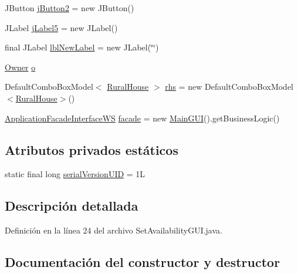 \begin{DoxyCompactItemize}
\item 
J\+Button \mbox{\hyperlink{classgui_1_1_set_availability_g_u_i_aae752324eac2634daf58978458c780cd}{j\+Button2}} = new J\+Button()
\item 
J\+Label \mbox{\hyperlink{classgui_1_1_set_availability_g_u_i_adaff504659254070536d646b331e2e5f}{j\+Label5}} = new J\+Label()
\item 
final J\+Label \mbox{\hyperlink{classgui_1_1_set_availability_g_u_i_a1f6f638242c97025fc857440f6669918}{lbl\+New\+Label}} = new J\+Label(\char`\"{}\char`\"{})
\item 
\mbox{\hyperlink{classdomain_1_1_owner}{Owner}} \mbox{\hyperlink{classgui_1_1_set_availability_g_u_i_a02f2fb2b0ea2556d734c4f066d396f44}{o}}
\item 
Default\+Combo\+Box\+Model$<$ \mbox{\hyperlink{classdomain_1_1_rural_house}{Rural\+House}} $>$ \mbox{\hyperlink{classgui_1_1_set_availability_g_u_i_a8ca9854f982f38653c058c2d5fae0110}{rhs}} = new Default\+Combo\+Box\+Model$<$\mbox{\hyperlink{classdomain_1_1_rural_house}{Rural\+House}}$>$()
\item 
\mbox{\hyperlink{interfacebusiness_logic_1_1_application_facade_interface_w_s}{Application\+Facade\+Interface\+WS}} \mbox{\hyperlink{classgui_1_1_set_availability_g_u_i_af95034b6b6816249cfe637bd01f40738}{facade}} = new \mbox{\hyperlink{classgui_1_1_main_g_u_i}{Main\+G\+UI}}().get\+Business\+Logic()
\end{DoxyCompactItemize}
\subsection*{Atributos privados estáticos}
\begin{DoxyCompactItemize}
\item 
static final long \mbox{\hyperlink{classgui_1_1_set_availability_g_u_i_a2ac5c9f0315a16b755fd41ce36871808}{serial\+Version\+U\+ID}} = 1L
\end{DoxyCompactItemize}


\subsection{Descripción detallada}


Definición en la línea 24 del archivo Set\+Availability\+G\+U\+I.\+java.



\subsection{Documentación del constructor y destructor}
\mbox{\label{classgui_1_1_set_availability_g_u_i_a4222ca741f88236a6bf90ee6719dc2d1}} 
